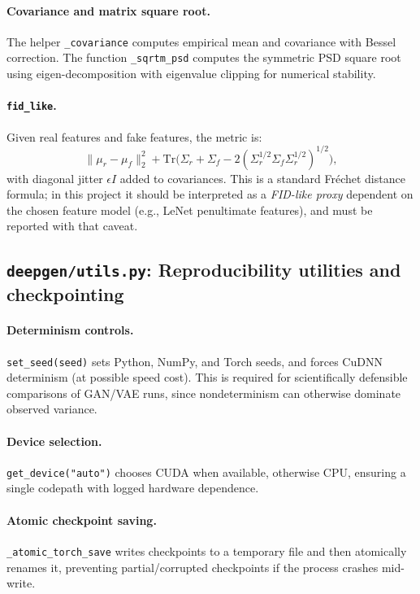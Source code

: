 \paragraph{Covariance and matrix square root.}
The helper \texttt{\_covariance} computes empirical mean and covariance with Bessel correction. The function \texttt{\_sqrtm\_psd} computes the symmetric PSD square root using eigen-decomposition with eigenvalue clipping for numerical stability.

\paragraph{\texttt{fid\_like}.}
Given real features and fake features, the metric is:
\[
\|\mu_r-\mu_f\|_2^2 + \mathrm{Tr}\Big(\Sigma_r+\Sigma_f-2(\Sigma_r^{1/2}\Sigma_f\Sigma_r^{1/2})^{1/2}\Big),
\]
with diagonal jitter $\epsilon I$ added to covariances. This is a standard Fréchet distance formula; in this project it should be interpreted as a \emph{FID-like proxy} dependent on the chosen feature model (e.g., LeNet penultimate features), and must be reported with that caveat.

\subsection{\texttt{deepgen/utils.py}: Reproducibility utilities and checkpointing}
\paragraph{Determinism controls.}
\texttt{set\_seed(seed)} sets Python, NumPy, and Torch seeds, and forces CuDNN determinism (at possible speed cost). This is required for scientifically defensible comparisons of GAN/VAE runs, since nondeterminism can otherwise dominate observed variance.

\paragraph{Device selection.}
\texttt{get\_device("auto")} chooses CUDA when available, otherwise CPU, ensuring a single codepath with logged hardware dependence.

\paragraph{Atomic checkpoint saving.}
\texttt{\_atomic\_torch\_save} writes checkpoints to a temporary file and then atomically renames it, preventing partial/corrupted checkpoints if the process crashes mid-write.

